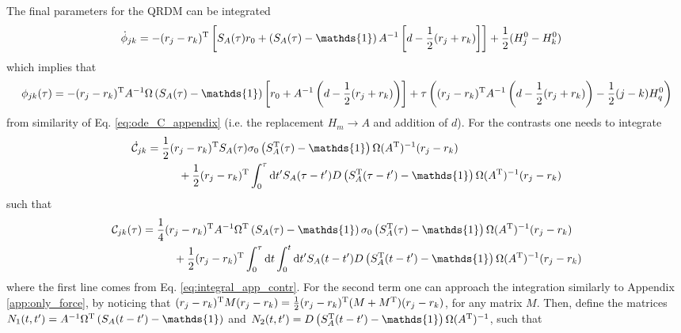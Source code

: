 \documentclass[%
reprint,
superscriptaddress,
nofootinbib,
 amsmath,amssymb,
prx,
floatfix,
]{revtex4-2}
\begin{document}
The final parameters for the QRDM can be integrated
\begin{align*}
    \dot{\phi}_{jk} &= - (r_j  - r_k )^{\rm T} \left[ S_A (\tau) r_0  +     \left(S_A(\tau) - \mathds{1} \right) A^{-1} \left[ d - \frac{1}{2}  (r_j + r_k) \right] \right] + \frac{1}{2} (H_j^0-H_k^0) 
\end{align*}
which implies that
\begin{align}
    \phi_{jk} (\tau) =  - (r_j - r_k)^{\rm T} A^{-1} \Omega \left( S_A (\tau)  - \mathds{1} \right) \left[ r_0  + A^{-1} \left( d  - \frac{1}{2} (r_j + r_k) \right) 
    \right] + \tau\left( (r_j - r_k)^{\rm T} A^{-1} \left(d - \frac{1}{2} (r_j + r_k) \right) -  \frac{1}{2} (j-k) H_q^0 \right) \nonumber
\end{align}
from similarity of Eq. \ref{eq:ode_C_appendix} (i.e. the replacement $H_m \to A$ and addition of $d$). For the contrasts one needs to integrate
\begin{align*}
    \dot{\mathcal{C}}_{jk} &=   \frac{1}{2}  (r_j - r_k)^{\rm T}  S_A(\tau) \sigma_0 \left(S_A^{\rm T}(\tau) - \mathds{1} \right)  \Omega  (A^{\rm T})^{-1} (r_j - r_k)  \\
    &\hspace{1cm} +  \frac{1}{2}  (r_j - r_k)^{\rm T} \int_0^{\tau} \text{d}t'  S_A(\tau- t') D \left( S^{\rm T}_A(\tau - t') - \mathds{1} \right) \Omega (A^{\rm T})^{-1} (r_j - r_k)
\end{align*}
such that
\begin{align*}
     \mathcal{C}_{jk} (\tau)  &=  \frac{1}{4} (r_j - r_k)^{\rm T} A^{-1}  \Omega^{\rm T} \left( S_A(\tau) - \mathds{1} \right) \sigma_0 \left(S^{\rm T}_A(\tau) - \mathds{1} \right) \Omega  (A^{\rm T})^{-1} (r_j - r_k)   \nonumber \\
     &\hspace{1cm} + \frac{1}{2}  (r_j - r_k)^{\rm T} \int_0^\tau \text{d} t \int_0^{t} \text{d}t'  S_A(t- t') D \left( S^{\rm T}_A(t - t') - \mathds{1} \right) \Omega (A^{\rm T})^{-1} (r_j - r_k) 
\end{align*}
where the first line comes from Eq. \ref{eq:integral_app_contr}. For the second term one can approach the integration similarly to Appendix \ref{app:only_force}, by noticing that $(r_j - r_k)^{\rm T} M (r_j - r_k)  = \frac{1}{2} (r_j - r_k)^{\rm T} (M+M^{\rm T}) (r_j - r_k)$, for any matrix $M$.  Then, define the matrices $N_1(t, t') = A^{-1}  \Omega^{\rm T} \left(S_A(t - t') - \mathds{1} \right)  $ and $N_2(t, t') =  D \left(S_A^{\rm T}(t - t') - \mathds{1} \right)  \Omega (A^{\rm T})^{-1} $, such that 
\end{document}
